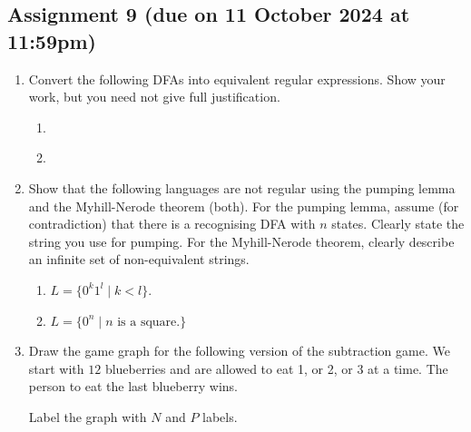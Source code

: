 \documentclass{amsart}
\begin{document}
\subsection{Assignment 9  (due on 11 October 2024 at 11:59pm)}
\label{sec:orgeaf6908}
\toggletrue{solutions}

\begin{enumerate}
\item Convert the following DFAs into equivalent regular expressions.
Show your work, but you need not give full justification.

\begin{enumerate}
\item \mbox{}
\begin{center}
        \tikzset{>=latex}
\end{center}
\item \mbox{}
\begin{center}
\tikzset{>=latex}
\end{center}
\end{enumerate}

\item Show that the following languages are not regular using the pumping lemma and the Myhill-Nerode theorem (both).
For the pumping lemma, assume (for contradiction) that there is a recognising DFA with \(n\) states.
Clearly state the string you use for pumping.
For the Myhill-Nerode theorem, clearly describe an infinite set of non-equivalent strings.

\begin{enumerate}
\item \(L = \{0^k 1^l \mid k < l\}\).
\item \(L = \{0^{n} \mid n \text{ is a square.}\}\)
\end{enumerate}

\item Draw the game graph for the following version of the subtraction game.
We start with \(12\) blueberries and are allowed to eat 1, or 2, or 3 at a time.
The person to eat the last blueberry wins.

Label the graph with \(N\) and \(P\) labels.
\end{enumerate}
\end{document}
